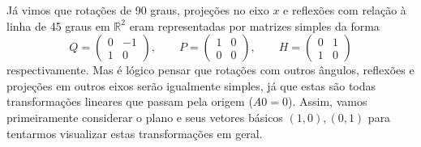 Já vimos que rotações de 90 graus, projeções no eixo $x$ e reflexões com relação à linha de 45 graus em ${\mathbb{R}}^2$ eram representadas por matrizes simples da forma
\begin{equation*}
  Q=
  \begin{pmatrix}
     0 & -1\\
     1 & 0
  \end{pmatrix}
  , \qquad P=
  \begin{pmatrix}
     1 & 0\\
     0 & 0
  \end{pmatrix}
  , \qquad H=
  \begin{pmatrix}
     0 & 1\\
     1 & 0
  \end{pmatrix}
\end{equation*}
respectivamente. Mas é lógico pensar que rotações com outros ângulos, reflexões e projeções em outros eixos serão igualmente simples, já que estas são todas transformações lineares que passam pela origem ($A0=0$). Assim, vamos primeiramente considerar o plano e seus vetores básicos $(1,0), (0,1)$ para tentarmos visualizar estas transformações em geral.

